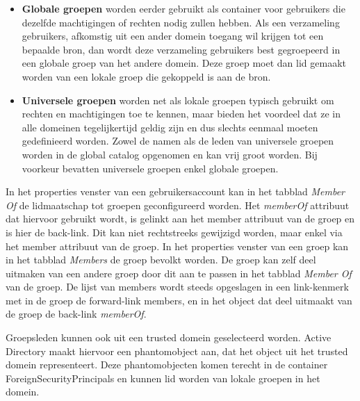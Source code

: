 \begin{enumerate}
{\begin{itemize}
				\item \textbf{Globale groepen} worden eerder gebruikt als container voor gebruikers die dezelfde machtigingen of rechten nodig zullen hebben. Als een verzameling gebruikers, afkomstig uit een ander domein toegang wil krijgen tot een bepaalde bron, dan wordt deze verzameling gebruikers best gegroepeerd in een globale groep van het andere domein. Deze groep moet dan lid gemaakt worden van een lokale groep die gekoppeld is aan de bron.

				\item \textbf{Universele groepen} worden net als lokale groepen typisch gebruikt om rechten en machtigingen toe te kennen, maar bieden het voordeel dat ze in alle domeinen tegelijkertijd geldig zijn en dus slechts eenmaal moeten gedefinieerd worden. Zowel de namen als de leden van universele groepen worden in de global catalog opgenomen en kan vrij groot worden. Bij voorkeur bevatten universele groepen enkel globale groepen.
			\end{itemize}
		}
		
		 {
			In het properties venster van een gebruikersaccount kan in het tabblad \emph{Member Of} de lidmaatschap tot groepen geconfigureerd worden. Het \emph{memberOf} attribuut dat hiervoor gebruikt wordt, is gelinkt aan het member attribuut van de groep en is hier de back-link. Dit kan niet rechtstreeks gewijzigd worden, maar enkel via het member attribuut van de groep. In het properties venster van een groep kan in het tabblad \emph{Members} de groep bevolkt worden. De groep kan zelf deel uitmaken van een andere groep door dit aan te passen in het tabblad \emph{Member Of} van de groep. De lijst van members wordt steeds opgeslagen in een link-kenmerk met in de groep de forward-link members, en in het object dat deel uitmaakt van de groep de back-link \emph{memberOf}. 

				Groepsleden kunnen ook uit een trusted domein geselecteerd worden. Active Directory maakt hiervoor een phantomobject aan, dat het object uit het trusted domein representeert. Deze phantomobjecten komen terecht in de container ForeignSecurityPrincipals en kunnen lid worden van lokale groepen in het domein.

}
\end{enumerate}
